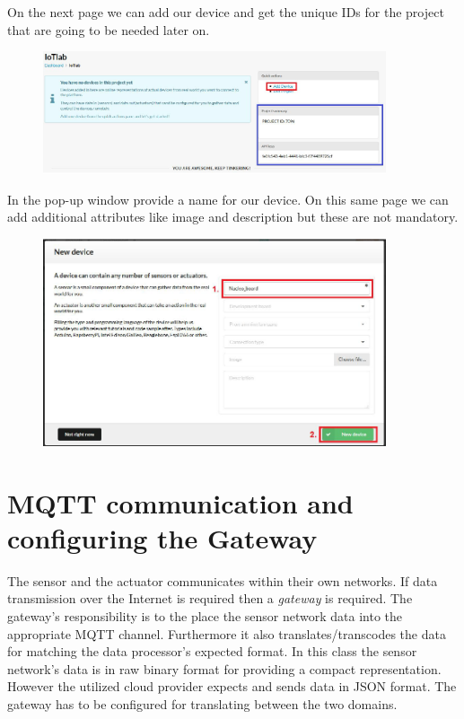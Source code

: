 \documentclass[a4paper]{article}
\begin{document}
On the next page we can add our device and get the unique IDs for the project that are going to be needed later on.

\begin{figure}[H]
    \centering
    \includegraphics[width=0.9\textwidth]{figures/devicehub-adddevice.png}
\end{figure}

In the pop-up window provide a name for our device. On this same page we can add additional attributes like image and
description but these are not mandatory.

\begin{figure}[H]
    \centering
    \includegraphics[width=0.9\textwidth]{figures/devicehub-newdevice.png}
\end{figure}

\section{MQTT communication and configuring the Gateway}

The sensor and the actuator communicates within their own networks. 
If data transmission over the Internet is required then a \emph{gateway} is required.
The gateway's responsibility is to the place the sensor network data into the appropriate
MQTT channel. Furthermore it also translates/transcodes the data for matching the
data processor's expected format. In this class the sensor network's data is in raw binary format
for providing a compact representation. However the utilized cloud provider expects and sends
data in JSON format. The gateway has to be configured for translating between the two domains.
\end{document}

